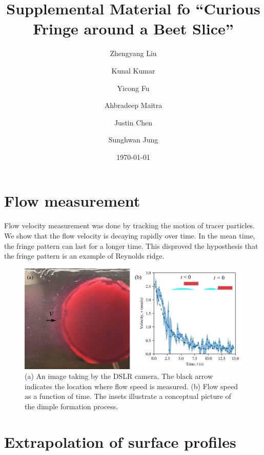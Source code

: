 \documentclass[aps,preprint]{revtex4-2}
\begin{document}
\title{Supplemental Material fo ``Curious Fringe around a Beet Slice''}

\author{Zhengyang Liu}
\author{Kunal Kumar}
\author{Yicong Fu}
\author{Ahbradeep Maitra}
\author{Justin Chen}
\author{Sunghwan Jung}
\date{\today}
\maketitle

\section{Flow measurement}

Flow velocity measurement was done by tracking the motion of tracer particles.
We show that the flow velocity is decaying rapidly over time. 
In the mean time, the fringe pattern can last for a longer time.
This disproved the hyposthesis that the fringe pattern is an example of Reynolds ridge.

\begin{figure}[ht]
    \centering
    \includegraphics[width=\linewidth]{Figures/beet_flow_measurement.png}
    \caption{
    (a) An image taking by the DSLR camera. The black arrow indicates the location where flow speed is measured.
    (b) Flow speed as a function of time. The insets illustrate a conceptual picture of the dimple formation process.
    }
    \label{fig:flow-measurement}
\end{figure}

\newpage

\section{Extrapolation of surface profiles}
\end{document}
